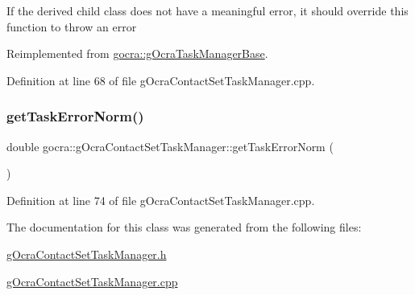 If the derived child class does not have a meaningful error, it should override this function to throw an error 

Reimplemented from \hyperlink{classgocra_1_1gOcraTaskManagerBase_a5c40a14b3a1d5a6519da422310d28f97}{gocra\+::g\+Ocra\+Task\+Manager\+Base}.



Definition at line 68 of file g\+Ocra\+Contact\+Set\+Task\+Manager.\+cpp.

\hypertarget{classgocra_1_1gOcraContactSetTaskManager_ac46c258f0b2762bce969b373baad110a}{}\label{classgocra_1_1gOcraContactSetTaskManager_ac46c258f0b2762bce969b373baad110a} 
\subsubsection{\texorpdfstring{get\+Task\+Error\+Norm()}{getTaskErrorNorm()}}
{\footnotesize\ttfamily double gocra\+::g\+Ocra\+Contact\+Set\+Task\+Manager\+::get\+Task\+Error\+Norm (\begin{DoxyParamCaption}{ }\end{DoxyParamCaption})}



Definition at line 74 of file g\+Ocra\+Contact\+Set\+Task\+Manager.\+cpp.



The documentation for this class was generated from the following files\+:\begin{DoxyCompactItemize}
\item 
\hyperlink{gOcraContactSetTaskManager_8h}{g\+Ocra\+Contact\+Set\+Task\+Manager.\+h}\item 
\hyperlink{gOcraContactSetTaskManager_8cpp}{g\+Ocra\+Contact\+Set\+Task\+Manager.\+cpp}\end{DoxyCompactItemize}
